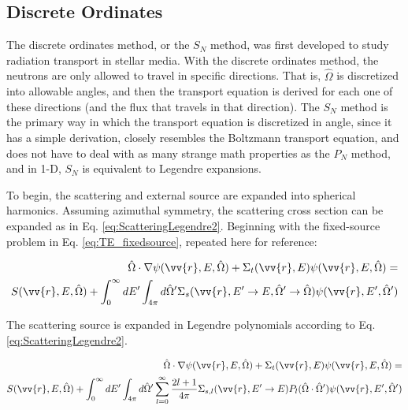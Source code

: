 \documentclass[10pt]{article}
\newcommand{\hO}{\hat{\Omega}}
\begin{document}
\begin{flushleft}
\subsection{Discrete Ordinates}
The discrete ordinates method, or the \(S_N\) method, was first developed to study radiation transport in stellar media. With the discrete ordinates method, the neutrons are only allowed to travel in specific directions. That is, \(\hO  \) is discretized into allowable angles, and then the transport equation is derived for each one of these directions (and the flux that travels in that direction). The \(S_N\) method is the primary way in which the transport equation is discretized in angle, since it has a simple derivation, closely resembles the Boltzmann transport equation, and does not have to deal with as many strange math properties as the \(P_N\) method, and in 1-D, \(S_N\) is equivalent to Legendre expansions. 

To begin, the scattering and external source are expanded into spherical harmonics. Assuming azimuthal symmetry, the scattering cross section can be expanded as in Eq. \eqref{eq:ScatteringLegendre2}. Beginning with the fixed-source problem in Eq. \eqref{eq:TE_fixedsource}, repeated here for reference:

\begin{equation*}
\begin{aligned}
 \hO  \cdot\nabla\psi(\vv{r}, E, \hO  ) + 
 \Sigma_t(\vv{r},E)\psi(\vv{r}, E, \hO  ) = \\
S(\vv{r}, E, \hO  ) + \int_{0}^{\infty}dE' \int_{4\pi}^{ } d\hO  ' \Sigma_s(\vv{r}, E'\rightarrow E, \hO  '\rightarrow\hO  )\psi(\vv{r}, E', \hO  ')\\
\end{aligned}
\end{equation*}

The scattering source is expanded in Legendre polynomials according to Eq. \eqref{eq:ScatteringLegendre2}.

\begin{equation}
\begin{aligned}
 \hO  \cdot\nabla\psi(\vv{r}, E, \hO  ) + 
 \Sigma_t(\vv{r},E)\psi(\vv{r}, E, \hO  ) = \\
S(\vv{r}, E, \hO  ) + \int_{0}^{\infty}dE' \int_{4\pi}^{ } d\hO  ' \sum_{l=0}^{\infty}\frac{2l+1}{4\pi}\Sigma_{s,l}(\vv{r}, E'\rightarrow E)P_l(\hO  \cdot\hO  ')\psi(\vv{r}, E', \hO  ')\\
\end{aligned}
\end{equation}


\end{flushleft}
\end{document}
